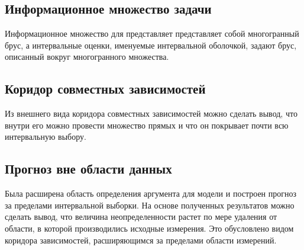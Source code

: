\subsection{Информационное множество задачи} 

Информационное множество для представляет представляет собой многогранный брус, а интервальные оценки, именуемые интервальной оболочкой, задают брус, описанный вокруг многогранного множества.

\subsection{Коридор совместных зависимостей}

Из внешнего вида коридора совместных зависимостей можно сделать вывод, что внутри его можно провести множество прямых и что он покрывает почти всю интервальную выбору. 

\subsection{Прогноз вне области данных}

Была расширена область определения аргумента для модели и построен прогноз за пределами интервальной выборки. На основе полученных результатов можно сделать вывод, что величина неопределенности растет по мере удаления от области, в которой производились исходные измерения. Это обусловлено видом коридора зависимостей, расширяющимся за пределами области измерений.